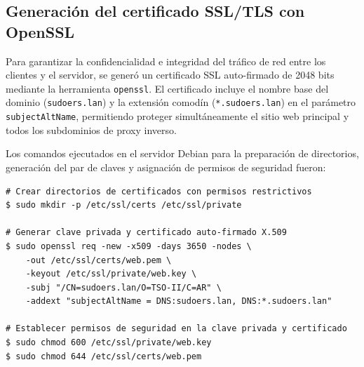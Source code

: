 \begin{table}[H]
\centering
\caption{Puertos de red del servidor web}
\label{tab:puertos-web}
\end{table}

\subsection{Generación del certificado SSL/TLS con OpenSSL}

Para garantizar la confidencialidad e integridad del tráfico de red entre los
clientes y el servidor, se generó un certificado SSL auto-firmado de 2048 bits
mediante la herramienta \texttt{openssl}. El certificado incluye el nombre base
del dominio (\texttt{sudoers.lan}) y la extensión comodín
(\texttt{*.sudoers.lan}) en el parámetro \texttt{subjectAltName}, permitiendo
proteger simultáneamente el sitio web principal y todos los subdominios de
proxy inverso.

Los comandos ejecutados en el servidor Debian para la preparación de directorios,
generación del par de claves y asignación de permisos de seguridad fueron:

\begin{lstlisting}[style=terminal]
# Crear directorios de certificados con permisos restrictivos
$ sudo mkdir -p /etc/ssl/certs /etc/ssl/private

# Generar clave privada y certificado auto-firmado X.509
$ sudo openssl req -new -x509 -days 3650 -nodes \
    -out /etc/ssl/certs/web.pem \
    -keyout /etc/ssl/private/web.key \
    -subj "/CN=sudoers.lan/O=TSO-II/C=AR" \
    -addext "subjectAltName = DNS:sudoers.lan, DNS:*.sudoers.lan"

# Establecer permisos de seguridad en la clave privada y certificado
$ sudo chmod 600 /etc/ssl/private/web.key
$ sudo chmod 644 /etc/ssl/certs/web.pem
\end{lstlisting}

